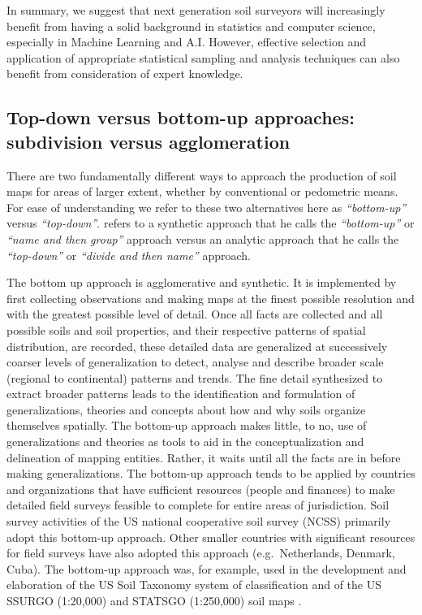 \documentclass[11pt]{krantz}
\theoremstyle{definition}
\theoremstyle{definition}
\theoremstyle{definition}
\theoremstyle{remark}
\begin{document}
In summary, we suggest that next generation soil surveyors will
increasingly benefit from having a solid background in statistics and
computer science, especially in Machine Learning and A.I. However,
effective selection and application of appropriate statistical sampling
and analysis techniques can also benefit from consideration of expert
knowledge.

\hypertarget{top-down}{%
\subsection{Top-down versus bottom-up approaches: subdivision versus
agglomeration}\label{top-down}}

There are two fundamentally different ways to approach the production of
soil maps for areas of larger extent, whether by conventional or
pedometric means. For ease of understanding we refer to these two
alternatives here as \emph{``bottom-up''} versus \emph{``top-down''}.
\citet{Rossiter2001} refers to a synthetic approach that he calls the
\emph{``bottom-up''} or \emph{``name and then group''} approach versus
an analytic approach that he calls the \emph{``top-down''} or
\emph{``divide and then name''} approach.

The bottom up approach is agglomerative and synthetic. It is implemented
by first collecting observations and making maps at the finest possible
resolution and with the greatest possible level of detail. Once all
facts are collected and all possible soils and soil properties, and
their respective patterns of spatial distribution, are recorded, these
detailed data are generalized at successively coarser levels of
generalization to detect, analyse and describe broader scale (regional
to continental) patterns and trends. The fine detail synthesized to
extract broader patterns leads to the identification and formulation of
generalizations, theories and concepts about how and why soils organize
themselves spatially. The bottom-up approach makes little, to no, use of
generalizations and theories as tools to aid in the conceptualization
and delineation of mapping entities. Rather, it waits until all the
facts are in before making generalizations. The bottom-up approach tends
to be applied by countries and organizations that have sufficient
resources (people and finances) to make detailed field surveys feasible
to complete for entire areas of jurisdiction. Soil survey activities of
the US national cooperative soil survey (NCSS) primarily adopt this
bottom-up approach. Other smaller countries with significant resources
for field surveys have also adopted this approach (e.g.~Netherlands,
Denmark, Cuba). The bottom-up approach was, for example, used in the
development and elaboration of the US Soil Taxonomy system of
classification and of the US SSURGO (1:20,000) and STATSGO (1:250,000)
soil maps \citep{ZHONG2011491}.
\end{document}
